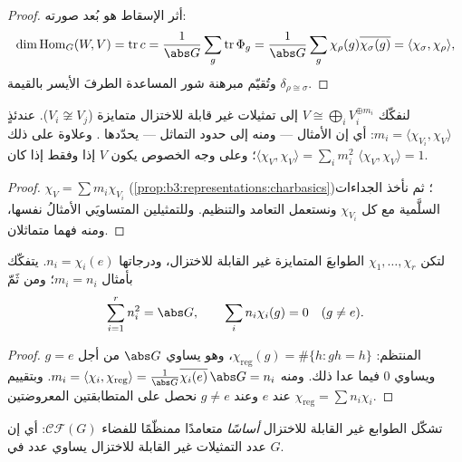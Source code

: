 \begin{proof}
أثر الإسقاط هو بُعد صورته:
\[
\dim\operatorname{Hom}_G(W, V) = \operatorname{tr} c
= \frac1{\abs G}\sum_g \operatorname{tr}\Phi_g
= \frac1{\abs G}\sum_g \chi_\rho(g)\overline{\chi_\sigma(g)}
= \langle \chi_\sigma, \chi_\rho\rangle,
\]
وتُقيّم مبرهنة شور المساعدة الطرفَ الأيسر بالقيمة $\delta_{\rho \cong
\sigma}$.
\end{proof}

\begin{corollary}\label{cor:b3:representations:multiplicity}
لنفكّك $V \cong \bigoplus_i V_i^{\oplus m_i}$ إلى تمثيلات غير قابلة للاختزال متمايزة ($V_i \not\cong V_j$).
عندئذٍ $m_i = \langle
\chi_{V_i}, \chi_V\rangle$: أي إن الأمثال --- ومنه  إلى حدود التماثل
--- يحدّدها . وعلاوة على ذلك $\langle \chi_V, \chi_V\rangle = \sum_i
m_i^2$؛ وعلى وجه الخصوص يكون
$V$  إذا وفقط إذا كان $\langle\chi_V,
\chi_V\rangle = 1$.
\end{corollary}

\begin{proof}
$\chi_V = \sum m_i\chi_{V_i}$
(\cref{prop:b3:representations:charbasics})؛ ثم نأخذ الجداءات السلَّمية مع كل $\chi_{V_i}$
ونستعمل التعامد والتنظيم. وللتمثيلين المتساويَي  الأمثالُ
نفسها، ومنه فهما متماثلان.
\end{proof}

\begin{theorem}
\label{thm:b3:representations:regular}
لتكن $\chi_1, \dots, \chi_r$ الطوابعَ المتمايزة غير القابلة للاختزال، ودرجاتها
$n_i = \chi_i(e)$. يتفكّك  بأمثال $m_i = n_i$؛ ومن ثَمّ
\[
\sum_{i=1}^{r} n_i^2 = \abs G,
\qquad
\sum_i n_i\chi_i(g) = 0 \quad (g \neq e).
\]
\end{theorem}

\begin{proof}
 المنتظم: $\chi_{\mathrm{reg}}(g) =
\#\{h : gh = h\}$، وهو يساوي $\abs G$ من أجل $g = e$
ويساوي $0$ فيما عدا ذلك. ومنه $m_i = \langle \chi_i,\chi_{\mathrm{reg}}\rangle =
\frac1{\abs G}\overline{\chi_i(e)}\,\abs G = n_i$. وبتقييم $\chi_{\mathrm{reg}} = \sum n_i\chi_i$ عند $e$
وعند $g \neq e$ نحصل على المتطابقتين المعروضتين.
\end{proof}

\begin{theorem}\label{thm:b3:representations:numberirr}
تشكّل الطوابع غير القابلة للاختزال \emph{أساسًا} متعامدًا ممنظّمًا
للفضاء $\mathcal{CF}(G)$: أي إن عدد التمثيلات غير القابلة للاختزال يساوي
عدد  في $G$.
\end{theorem}

